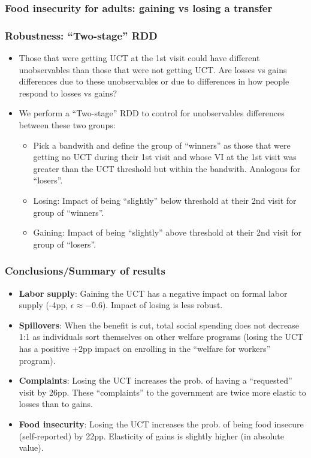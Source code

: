 \documentclass{beamer}
\begin{document}
\begin{frame}
\frametitle{Food insecurity for adults: gaining vs losing a transfer}
\begin{figure}

\end{figure}
\end{frame}

\begin{frame}
\frametitle{Robustness: ``Two-stage'' RDD}
\begin{itemize}
	\item Those that were getting UCT at the 1st visit could have different unobservables than those that were not getting UCT. Are losses vs gains differences due to these unobservables or due to differences in how people respond to losses vs gains?
	\item We perform a ``Two-stage'' RDD to control for unobservables differences between these two groups:
	\begin{itemize}
		\item Pick a bandwith and define the group of ``winners'' as those that were getting no UCT during their 1st visit and whose VI at the 1st visit was greater than the UCT threshold but within the bandwith. Analogous for ``losers''.
		\item Losing: Impact of being ``slightly'' below threshold at their 2nd visit for group of ``winners''.
		\item Gaining: Impact of being ``slightly'' above threshold at their 2nd visit for group of ``losers''.   
	\end{itemize}
\end{itemize}
\end{frame}

\begin{frame}
\frametitle{Conclusions/Summary of results}
\begin{itemize}
	\item \textbf{Labor supply}: Gaining the UCT has a negative impact on formal labor supply (-4pp, $\epsilon \approx -0.6$). Impact of losing is less robust.
	\item \textbf{Spillovers}: When the benefit is cut, total social spending does not decrease 1:1 as individuals sort themselves on other welfare programs (losing the UCT has a positive +2pp impact on enrolling in the ``welfare for workers'' program).
	\item \textbf{Complaints}: Losing the UCT increases the prob. of having a ``requested'' visit by 26pp. These ``complaints'' to the government are twice more elastic to losses than to gains.
	\item \textbf{Food insecurity}: Losing the UCT increases the prob. of being food insecure (self-reported) by 22pp. Elasticity of gains is slightly higher (in absolute value).
\end{itemize}
\end{frame}
\end{document}

